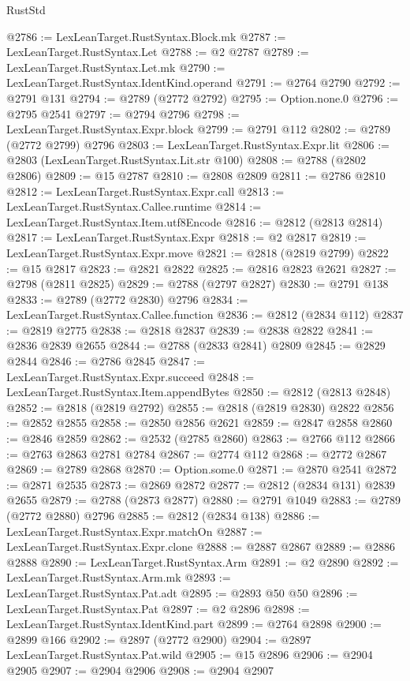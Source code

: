 \begin{lexlean}{RustStd}
\begin{coremodule}
@2786 := LexLeanTarget.RustSyntax.Block.mk
@2787 := LexLeanTarget.RustSyntax.Let
@2788 := @2 @2787
@2789 := LexLeanTarget.RustSyntax.Let.mk
@2790 := LexLeanTarget.RustSyntax.IdentKind.operand
@2791 := @2764 @2790
@2792 := @2791 @131
@2794 := @2789 (@2772 @2792)
@2795 := Option.none.{0}
@2796 := @2795 @2541
@2797 := @2794 @2796
@2798 := LexLeanTarget.RustSyntax.Expr.block
@2799 := @2791 @112
@2802 := @2789 (@2772 @2799) @2796
@2803 := LexLeanTarget.RustSyntax.Expr.lit
@2806 := @2803 (LexLeanTarget.RustSyntax.Lit.str @100)
@2808 := @2788 (@2802 @2806)
@2809 := @15 @2787
@2810 := @2808 @2809
@2811 := @2786 @2810
@2812 := LexLeanTarget.RustSyntax.Expr.call
@2813 := LexLeanTarget.RustSyntax.Callee.runtime
@2814 := LexLeanTarget.RustSyntax.Item.utf8Encode
@2816 := @2812 (@2813 @2814)
@2817 := LexLeanTarget.RustSyntax.Expr
@2818 := @2 @2817
@2819 := LexLeanTarget.RustSyntax.Expr.move
@2821 := @2818 (@2819 @2799)
@2822 := @15 @2817
@2823 := @2821 @2822
@2825 := @2816 @2823 @2621
@2827 := @2798 (@2811 @2825)
@2829 := @2788 (@2797 @2827)
@2830 := @2791 @138
@2833 := @2789 (@2772 @2830) @2796
@2834 := LexLeanTarget.RustSyntax.Callee.function
@2836 := @2812 (@2834 @112)
@2837 := @2819 @2775
@2838 := @2818 @2837
@2839 := @2838 @2822
@2841 := @2836 @2839 @2655
@2844 := @2788 (@2833 @2841) @2809
@2845 := @2829 @2844
@2846 := @2786 @2845
@2847 := LexLeanTarget.RustSyntax.Expr.succeed
@2848 := LexLeanTarget.RustSyntax.Item.appendBytes
@2850 := @2812 (@2813 @2848)
@2852 := @2818 (@2819 @2792)
@2855 := @2818 (@2819 @2830) @2822
@2856 := @2852 @2855
@2858 := @2850 @2856 @2621
@2859 := @2847 @2858
@2860 := @2846 @2859
@2862 := @2532 (@2785 @2860)
@2863 := @2766 @112
@2866 := @2763 @2863 @2781 @2784
@2867 := @2774 @112
@2868 := @2772 @2867
@2869 := @2789 @2868
@2870 := Option.some.{0}
@2871 := @2870 @2541
@2872 := @2871 @2535
@2873 := @2869 @2872
@2877 := @2812 (@2834 @131) @2839 @2655
@2879 := @2788 (@2873 @2877)
@2880 := @2791 @1049
@2883 := @2789 (@2772 @2880) @2796
@2885 := @2812 (@2834 @138)
@2886 := LexLeanTarget.RustSyntax.Expr.matchOn
@2887 := LexLeanTarget.RustSyntax.Expr.clone
@2888 := @2887 @2867
@2889 := @2886 @2888
@2890 := LexLeanTarget.RustSyntax.Arm
@2891 := @2 @2890
@2892 := LexLeanTarget.RustSyntax.Arm.mk
@2893 := LexLeanTarget.RustSyntax.Pat.adt
@2895 := @2893 @50 @50
@2896 := LexLeanTarget.RustSyntax.Pat
@2897 := @2 @2896
@2898 := LexLeanTarget.RustSyntax.IdentKind.part
@2899 := @2764 @2898
@2900 := @2899 @166
@2902 := @2897 (@2772 @2900)
@2904 := @2897 LexLeanTarget.RustSyntax.Pat.wild
@2905 := @15 @2896
@2906 := @2904 @2905
@2907 := @2904 @2906
@2908 := @2904 @2907

\end{coremodule}
\end{lexlean}
